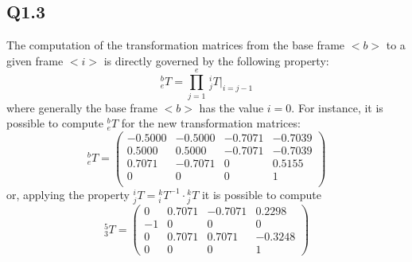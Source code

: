 \subsection{Q1.3}
The computation of the transformation matrices from the base frame $<b>$ to a given frame $<i>$ is directly governed by the following property:
\begin{equation}
	^b_e T = \prod_{j=1}^{e}\, {}^{i}_{j} T\Big\vert _{i=j-1}
\end{equation}
where generally the base frame $<b>$ has the value $i=0$. For instance, it is possible to compute $^b_e T$ for the new transformation matrices:
\begin{equation*}
		^b_e T = \begin{pmatrix}
		-0.5000 & -0.5000 & -0.7071 & -0.7039\\
		0.5000 & 0.5000 & -0.7071 & -0.7039 \\
		0.7071 & -0.7071 & 0 & 0.5155 \\
		0 & 0 & 0 & 1 \\
		\end{pmatrix}
\end{equation*}
or, applying the property $^i_j T = {}^k_i T^{-1} \cdot {}^k_j T$ it is possible to compute
\begin{equation*}
	^5_3 T = \begin{pmatrix}
		0 & 0.7071 & -0.7071 & 0.2298 \\
		-1 & 0 & 0 & 0\\
         0 & 0.7071 & 0.7071 & -0.3248 \\
         0 & 0 & 0 & 1
         \end{pmatrix}
\end{equation*}


